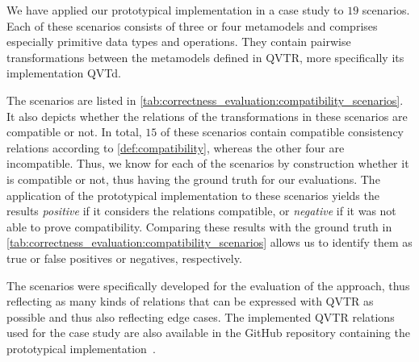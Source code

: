We have applied our prototypical implementation in a case study to $19$ scenarios.
Each of these scenarios consists of three or four metamodels and comprises especially primitive data types and operations.
They contain pairwise transformations between the metamodels defined in \gls{QVTR}, more specifically its implementation \gls{QVTd}.

The scenarios are listed in \autoref{tab:correctness_evaluation:compatibility_scenarios}.
It also depicts whether the relations of the transformations in these scenarios are compatible or not.
In total, $15$ of these scenarios contain compatible consistency relations according to \autoref{def:compatibility}, whereas the other four are incompatible.
Thus, we know for each of the scenarios by construction whether it is compatible or not, thus having the ground truth for our evaluations.
The application of the prototypical implementation to these scenarios yields the results \emph{positive} if it considers the relations compatible, or \emph{negative} if it was not able to prove compatibility.
Comparing these results with the ground truth in \autoref{tab:correctness_evaluation:compatibility_scenarios} allows us to identify them as true or false positives or negatives, respectively.

The scenarios were specifically developed for the evaluation of the approach, thus reflecting as many kinds of relations that can be expressed with \gls{QVTR} as possible and thus also reflecting edge cases.
The implemented \gls{QVTR} relations used for the case study are also available in the GitHub repository containing the prototypical implementation~\cite{decompositionGithub}.




